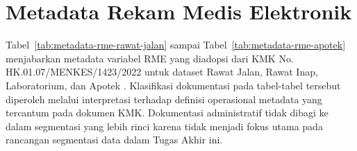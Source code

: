 \chapter{Metadata Rekam Medis Elektronik}
\label{lampiran:metadata-rme}

Tabel~\ref{tab:metadata-rme-rawat-jalan} sampai Tabel~\ref{tab:metadata-rme-apotek} menjabarkan metadata variabel RME yang diadopsi dari KMK No. HK.01.07/MENKES/1423/2022 untuk dataset Rawat Jalan, Rawat Inap, Laboratorium, dan Apotek \autocite{kemenkes1423-2022}. Klasifikasi dokumentasi pada tabel-tabel tersebut diperoleh melalui interpretasi terhadap definisi operasional metadata yang tercantum pada dokumen KMK. Dokumentasi administratif tidak dibagi ke dalam segmentasi yang lebih rinci karena tidak menjadi fokus utama pada rancangan segmentasi data dalam Tugas Akhir ini.

